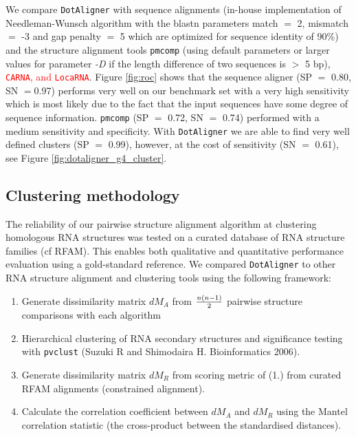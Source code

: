 \documentclass[a4paper,twoside]{article}
\newcommand\dotaligner{\texttt{DotAligner}}
\newcommand\pmcomp{\texttt{pmcomp}}
\newcommand\locarna{\texttt{LocaRNA}}
\newcommand\pvclust{\texttt{pvclust}}
\newcommand\carna{\texttt{CARNA}}
\newcommand{\RED}[1]{\textcolor{red}{#1}}
\begin{document}
\noindent We compare \dotaligner{} with sequence alignments (in-house
implementation of Needleman-Wunsch algorithm with the blastn parameters match
$=$ 2, mismatch $=$ -3 and gap penalty $=$ 5 which are optimized for sequence
identity of 90\%) and the structure alignment tools \pmcomp{} (using default
parameters or larger values for parameter \emph{-D} if the length difference of
two sequences is $>$ 5 bp), \RED{\carna, and \locarna}. Figure \ref{fig:roc}
shows that the sequence aligner (SP $=$ 0.80, SN $=$0.97) performs very well on
our benchmark set with a very high sensitivity which is most likely due to the
fact that the input sequences have some degree of sequence information.
\pmcomp{} (SP $=$ 0.72, SN $=$ 0.74) performed with a medium sensitivity and
specificity. With \dotaligner{} we are able to find very well defined clusters (SP
$=$ 0.99), however, at the cost of sensitivity (SN $=$ 0.61), see Figure
\ref{fig:dotaligner_g4_cluster}.

\begin{figure*}[!ht]
  \centering
  {}
  \caption{Automated hierarchical clustering of 300 sequences from 10 H/ACA
  snoRNA families. The dissimilarity matrix was calculated through \dotaligner{}
  with gap penalty 4. The clustering was conducted by the R-package \pvclust{}
  with multiscale bootstrap resampling with number of bootstrap 1000. We define
  clusters (red rectangles) as Approximately Unbiased (AU) \textit{p}-values $>$
  0.95 rejecting the hypothesis that ``the cluster does not exist`` with
  significance level 0.05.}
  \label{fig:dotaligner_g4_cluster}
\end{figure*}


\subsection{Clustering methodology} 

\noindent The reliability of our pairwise structure alignment algorithm at
clustering homologous RNA structures was tested on a curated database of RNA
structure families (cf RFAM). This enables both qualitative and quantitative
performance evaluation using a gold-standard reference. We compared
\texttt{DotAligner} to other RNA structure alignment and clustering tools using
the following framework: 

\begin{enumerate}
\item Generate dissimilarity matrix $dM_A$ from ${n(n-1)}\over{2}$ pairwise structure comparisons with each algorithm
\item Hierarchical clustering of RNA secondary structures and significance testing with \pvclust{} (Suzuki R and Shimodaira H. Bioinformatics 2006).
\item Generate dissimilarity matrix $dM_R$ from scoring metric of (1.) from curated RFAM alignments (constrained alignment). 
\item Calculate the correlation coefficient between $dM_A$ and $dM_R$ using the Mantel correlation statistic (the cross-product between the standardised distances). 
\end{enumerate}
\end{document}
